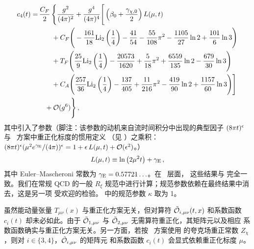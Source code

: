 \begin{equation}
  \begin{split}
    c_4 (t) =& \, \frac{C_F}{2} \, \Bigg\{ \gcoup{2} +
    \gcoup{4} \Bigg[ \left( \beta _0
      + \frac{\gamma_{\chi, 0}}{2} \right) L (\mu, t) \\
      & \qquad + C_F \Bigg( - \frac{161}{18}
      \text{Li}_2\left(\frac{1}{4}\right) - \frac{41}{54} -
      \frac{55}{108} \pi^2 - \frac{1105}{27} \ln 2 +
      \frac{101}{6} \ln 3 \Bigg) \\
      & \qquad + \TF \Bigg( \frac{25}{9}
      \text{Li}_2\left(\frac{1}{4}\right) -
      \frac{20573}{1620} + \frac{5}{18} \pi^2 +
      \frac{6559}{135} \ln 2 - \frac{679}{30} \ln 3 \Bigg)
      \\
      & \qquad + C_A \Bigg( \frac{257}{36}
      \text{Li}_2\left(\frac{1}{4}\right) - \frac{137}{405}
      + \frac{11}{216} \pi^2 - \frac{419}{90} \ln 2 +
      \frac{1157}{60} \ln 3 \Bigg) \Bigg] \\
    & \quad + \order{g^6} \Bigg\} \, ,
    \label{eq:c4}
  \end{split}
\end{equation}
其中引入了参数（脚注：该参数的动机来自流时间积分中出现的典型因子
$(8\pi t)^{\epsilon}$\,\cite{Luscher:2010iy} 与 \msbar\ 方案中重正化标度的惯用定义
（见 ）之乘积：$(8\pi t)^\epsilon
(\mu^2e^{\gamma_\text{E}}/(4\pi))^\epsilon = 1 +
  \epsilon\,L(\mu,t) + {\cal O}(\epsilon^2)$。）
\begin{equation}
	L (\mu, t) \equiv \ln \left( 2 \mu^2 t \right) + \gamma_\text{E}\,,
        \label{eq:lmut}
\end{equation}
其中 Euler--Mascheroni 常数为 $\gamma_\text{E}=0.57721\ldots$。在 \nlo\ 层面，
这些结果与  完全一致。我们在常规 QCD
的一般 $R_\xi$ 规范中进行计算；规范参数依赖在最终结果中消去，这是另一项
受欢迎的检验。 中的规范参数 $\kappa$ 取为 1。

虽然能动量张量 $T_{\mu\nu}(x)$ 与重正化方案无关，但对算符
$\tilde{\mathcal{O}}_{i,\mu\nu}(t,x)$ 和系数函数 $c_i(t)$ 却未必如此。由于
$\tilde{\mathcal{O}}_{1,\mu\nu}$ 与 $\tilde{\mathcal{O}}_{2,\mu\nu}$ 无需算符重正化，其矩阵元以及相应
系数函数确实与重正化方案无关。另一方面，若按 \msbar\ 方案使用 
的夸克场重正常数 $Z_\chi$，则对 $i\in\{3,4\}$，$\tilde{\mathcal{O}}_{i,\mu\nu}$ 的矩阵元
和系数函数 $c_i(t)$ 会显式依赖重正化标度 $\mu$。

